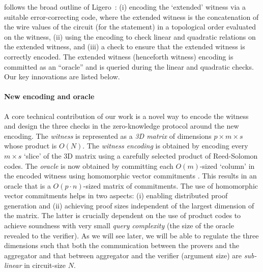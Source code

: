 \name{} follows the broad outline of Ligero~\cite{ligero}: 
(i) encoding the `extended' witness via a suitable error-correcting code, where the extended witness is the concatenation of the wire values of the circuit (for the statement) in a topological order evaluated on the witness, (ii) using the
encoding to check linear and quadratic relations on the extended
witness, and (iii) a check to ensure that the extended witness is correctly
encoded. The extended witness (henceforth witness) encoding is committed as an ``oracle'' and is queried
during the linear and quadratic checks.  Our key innovations are
listed below.  

\paragraph{New encoding and oracle} A core technical contribution of our
work is a novel way to encode the witness and design the three checks in
the zero-knowledge protocol around the new encoding. The \textit{witness} is
represented as a \textit{3D matrix} of dimensions $p \times m \times s$ whose
product is $O(N)$. The \textit{witness encoding} is obtained by encoding every
$m \times s$ `slice' of the 3D matrix using a carefully selected product of
Reed-Solomon codes.  The \textit{oracle} is now obtained by committing each $O(m)$-sized `column' in 
the encoded witness using homomorphic vector commitments \cite{Ped92}. 
This results in an oracle that is a $O(p \cdot n)$-sized matrix of commitments.
The use of homomorphic vector commitments helps in two aspects: (i) enabling
distributed proof generation and (ii) achieving proof sizes independent of the
largest dimension of the matrix. The latter is crucially dependent on the use
of product codes to achieve soundness with very small {\em query complexity} (the size of the
oracle revealed to the verifier).
As we will see later, we will be able to regulate the three dimensions such that
both the communication between the provers and the
aggregator and that between aggregator and the verifier (argument size) are 
{\em sub-linear} in circuit-size $N$. 

